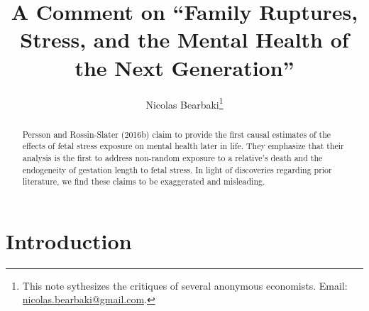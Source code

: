 \documentclass[a4paper,12pt]{article}
\begin{document}
\title{A Comment on ``Family Ruptures, Stress, and the Mental Health of the Next Generation''} 
\author{
	Nicolas Bearbaki\footnote{
    	This note sythesizes the critiques of several anonymous economists. Email: \href{mailto:nicolas.bearbaki@gmail.com}{nicolas.bearbaki@gmail.com}.}
        }
        
\maketitle
\begin{abstract}
\noindent Persson and Rossin-Slater (2016b) claim to provide the first causal estimates of the effects of fetal stress exposure on mental health later in life. They emphasize that their analysis is the first to address non-random exposure to a relative's death  and the endogeneity of gestation length to fetal stress. In light of discoveries regarding prior literature, we find these claims to be exaggerated and misleading.

\end{abstract}
\section{Introduction} 
\end{document}
